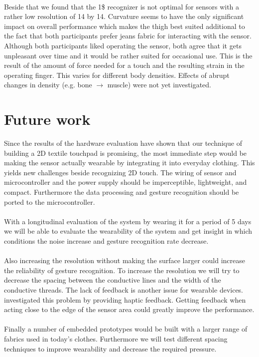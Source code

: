 \\
Beside that we found that the 1\$ recognizer is not optimal for sensors with a rather low resolution of 14 by 14. Curvature seems to have the only significant impact on overall performance which makes the thigh best suited additional to the fact that both participants prefer jeans fabric for interacting with the sensor. Although both participants liked operating the sensor, both agree that it gets unpleasant over time and it would be rather suited for occasional use. This is the result of the amount of force needed for a touch and the resulting strain in the operating finger. This varies for different body densities. Effects of abrupt changes in density (e.g. bone $\rightarrow$ muscle) were not yet investigated.

\section{Future work}
\label{summaryandfuturework.futurework}
Since the results of the hardware evaluation have shown that our technique of building a 2D textile touchpad is promising, the most immediate step would  be making the sensor actually wearable by integrating it into everyday clothing. This yields new challenges beside recognizing 2D touch. The wiring of sensor and microcontroller and the power supply should be imperceptible, lightweight, and compact. Furthermore the data processing and gesture recognition should be ported to the microcontroller. 
\\ \\
With a longitudinal evaluation of the system by wearing it for a period of 5 days we will be able to evaluate the wearability of the system and get insight in which conditions the noise increase and gesture recognition rate decrease.
\\ \\
Also increasing the resolution without making the surface larger could increase the reliability of gesture recognition. To increase the resolution we will try to decrease the spacing between the conductive lines and the width of the conductive threads. The lack of feedback is another issue for wearable devices. \cite{6636291} investigated this problem by providing haptic feedback. Getting feedback when acting close to the edge of the sensor area could greatly improve the performance. 
\\ \\
Finally a number of embedded prototypes would be built with a larger range of fabrics used in today's clothes. Furthermore we will test different spacing techniques to improve wearability and decrease the required pressure. 
